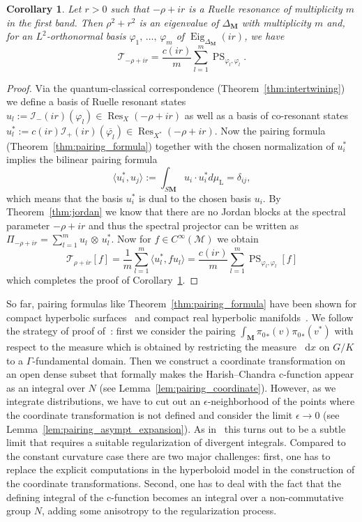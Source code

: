 \documentclass[10pt]{amsart}
\newtheorem{coro}[cdrthm]{Corollary}
\theoremstyle{definition}
\DeclareMathOperator{\Res}{Res}
\DeclareMathOperator{\Eig}{Eig}
\newcommand{\rml}{\mathrm{L}}
\newcommand{\bfm}{\mathbf{M}}
\newcommand{\cjd}{\rangle}
\newcommand{\cjg}{\langle}
\newcommand{\intd}{\mathop{}\!\mathrm{d}}
\begin{document}
\begin{coro}\label{coro6.2}
Let $r>0$ such that $-\rho+ir$ is a Ruelle resonance of multiplicity $m$ in the first band. Then $\rho^2+r^2$ is an eigenvalue of $\Delta_{\bfm}$ with multiplicity $m$ and, for an $L^2$-orthonormal basis $\varphi_1,\,\ldots,\,\varphi_m$ of $\Eig_{\Delta_{\mathbf M}}(ir)$, we have
\[
\mathcal T_{-\rho+ir} = \frac{c(ir)}{m} \sum_{l=1}^m \operatorname{PS}_{\varphi_l, \varphi_l}.
\]
\end{coro}

\begin{proof}
Via the quantum-classical correspondence (Theorem~\ref{thm:intertwining}) we define a basis of Ruelle resonant states $u_l:= \mathcal I_-(ir)(\varphi_{l}) \in \Res_{X}(-\rho+ir)$ as well as a basis of co-resonant states $u_l^*:= c(ir) \mathcal I_+(ir)(\overline{\varphi_{l}})\in
\Res_{X^*}(-\rho+ir)$. Now the pairing formula (Theorem~\ref{thm:pairing_formula}) together with the chosen normalization of $u_i^*$ implies the bilinear pairing formula
\[
\cjg u_i^*,u_j\cjd := \int_{S\mathbf M} u_i\cdot u_i^* d\mu_{\rml} = \delta_{ij},
\]
which means that the basis $u_i^*$ is dual to the chosen basis $u_i$. By Theorem~\ref{thm:jordan} we know that there are no Jordan blocks at the spectral parameter $-\rho+ir$ and thus the spectral projector can be written as $\Pi_{-\rho+ir} = \sum_{l=1}^{m} u_l\,\otimes\,u_l^*$. Now for $f\in C^{\infty}(\mathcal M)$ we obtain
\[
\mathcal T_{\rho+ir}[f] = \frac{1}{m} \sum_{l=1}^{m} \cjg u_l^*,f u_l\cjd = \frac{c(ir)}{m}\sum_{l=1}^{m} \operatorname{PS}_{\varphi_{l}, \varphi_{l}}[f]
\]
which completes the proof of Corollary~\ref{coro6.2}.
\end{proof}

So far, pairing formulas like Theorem~\ref{thm:pairing_formula} have been shown for compact hyperbolic surfaces~\cite[Theorem~1.2]{AZ07} and compact real hyperbolic manifolds~\cite[Lemma~5.10]{DFG15}. We follow the strategy of proof of~\cite{DFG15}: first we consider the pairing $\int_{\mathbf M} {\pi_0}_*(v){\pi_0}_*(v^*)$ with respect to the measure which is obtained by restricting the measure $\intd x$ on $G/K$ to a $\Gamma$-fundamental domain. Then we construct a coordinate transformation on an open dense subset that formally makes the Harish--Chandra c-function appear as an integral over $N$ (see Lemma~\ref{lem:pairing_coordinate}). However, as we integrate distributions, we have to cut out an $\epsilon$-neighborhood of the points where the coordinate transformation is not defined and consider the limit $\epsilon\to 0$ (see Lemma~\ref{lem:pairing_asympt_expansion}). As in~\cite{DFG15} this turns out to be a subtle limit that requires a suitable regularization of divergent integrals. Compared to the constant curvature case there are two major challenges: first, one has to replace the explicit computations in the hyperboloid model in the construction of the coordinate transformations. Second, one has to deal with the fact that the defining integral of the c-function becomes an integral over a non-commutative group $N$, adding some anisotropy to the regularization process.
\end{document}
